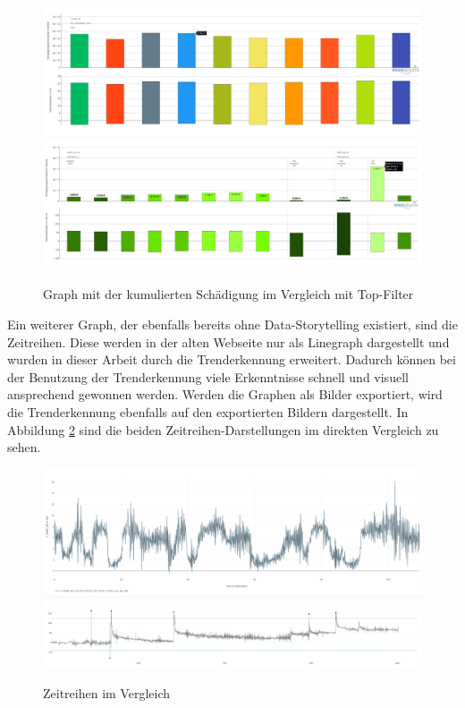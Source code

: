\begin{figure}
    \centering
    \includegraphics[width=1\linewidth]{gfx/top_vergleich_alt.png}
    \includegraphics[width=1\linewidth]{gfx/top_vergleich_neu.png}
    \caption{Graph mit der kumulierten Schädigung im Vergleich mit Top-Filter}
    \label{fig:top_filter_vergleich}
\end{figure}
\noindent
Ein weiterer Graph, der ebenfalls bereits ohne Data-Storytelling existiert, sind die Zeitreihen. Diese werden in der alten Webseite nur als Linegraph dargestellt und wurden in dieser Arbeit durch die Trenderkennung erweitert. Dadurch können bei der Benutzung der Trenderkennung viele Erkenntnisse schnell und visuell ansprechend gewonnen werden. Werden die Graphen als Bilder exportiert, wird die Trenderkennung ebenfalls auf den exportierten Bildern dargestellt. In Abbildung \ref{fig:timeseries_compare} sind die beiden Zeitreihen-Darstellungen im direkten Vergleich zu sehen.\\
\begin{figure}[!h]
    \centering
    \includegraphics[width=1\linewidth]{gfx/timeseries_old.png}
    \includegraphics[width=1\linewidth]{gfx/timeseries_new.png}
    \caption{Zeitreihen im Vergleich}
    \label{fig:timeseries_compare}
\end{figure}
